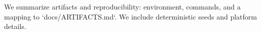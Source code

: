 We summarize artifacts and reproducibility: environment, commands, and a mapping to `docs/ARTIFACTS.md`. We include deterministic seeds and platform details.

